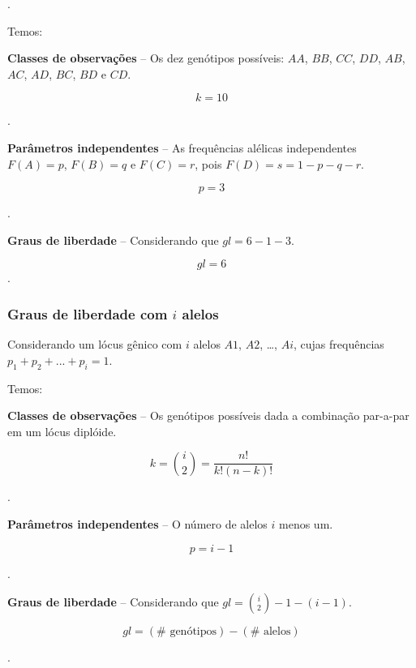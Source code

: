 \documentclass[
]{book}
\begin{document}
.\linebreak

Temos:

\textbf{Classes de observações} -- Os dez genótipos possíveis: \(AA\), \(BB\), \(CC\), \(DD\), \(AB\), \(AC\), \(AD\), \(BC\), \(BD\) e \(CD\).

\[k=10\]

.\linebreak

\textbf{Parâmetros independentes} -- As frequências alélicas independentes \(F(A)=p\), \(F(B)=q\) e \(F(C)=r\), pois \(F(D)=s=1-p-q-r\).

\[p=3\]

.\linebreak

\textbf{Graus de liberdade} -- Considerando que \(gl=6-1-3\).

\[gl=6\]
.\linebreak

\hypertarget{graus-de-liberdade-com-i-alelos}{%
\subsubsection{\texorpdfstring{Graus de liberdade com \(i\) alelos}{Graus de liberdade com i alelos}}\label{graus-de-liberdade-com-i-alelos}}

Considerando um lócus gênico com \(i\) alelos \(A1\), \(A2\), \ldots, \(Ai\), cujas frequências \(p_1+p_2+...+p_i=1\).

Temos:

\textbf{Classes de observações} -- Os genótipos possíveis dada a combinação par-a-par em um lócus diplóide.

\[k=\binom{i}{2} = \frac{n!}{k!\left ( n-k \right )!}\]

.\linebreak

\textbf{Parâmetros independentes} -- O número de alelos \(i\) menos um.

\[p=i-1\]

.\linebreak

\textbf{Graus de liberdade} -- Considerando que \(gl=\binom{i}{2}-1-(i-1)\).

\begin{equation} 
gl = (\text{# genótipos}) - (\text{# alelos})
\end{equation}

.\linebreak
\end{document}
